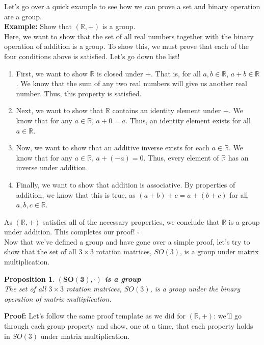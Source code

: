 \documentclass[oneside]{book}
\newtheorem{proposition}{Proposition}
\newenvironment{prop} %
  {\colorlet{shadecolor}{blue!9}\begin{shaded}\begin{proposition}}
  {\end{proposition}\end{shaded}}
\begin{document}
Let's go over a quick example to see how we can prove a set and binary operation are a group.\\
\textbf{Example:} Show that $(\mathbb{R}, +)$ is a group.\\
Here, we want to show that the set of all real numbers together with the binary operation of addition is a group. To show this, we must prove that each of the four conditions above is satisfied. Let's go down the list!
\begin{enumerate}
    \item First, we want to show $\mathbb{R}$ is closed under $+$. That is, for all $a, b \in \mathbb{R}$, $a + b \in \mathbb{R}$. We know that the sum of any two real numbers will give us another real number. Thus, this property is satisfied.
    \item Next, we want to show that $\mathbb{R}$ contains an identity element under $+$. We know that for any $a \in \mathbb{R}$, $a + 0 = a$. Thus, an identity element exists for all $a \in \mathbb{R}$.
    \item Now, we want to show that an additive inverse exists for each $a \in \mathbb{R}$. We know that for any $a \in \mathbb{R}$, $a + (-a) = 0$. Thus, every element of $\mathbb{R}$ has an inverse under addition.
    \item Finally, we want to show that addition is associative. By properties of addition, we know that this is true, as $(a+b)+c = a+(b+c)$ for all $a, b, c \in \mathbb{R}$.
\end{enumerate}
As $(\mathbb{R}, +)$ satisfies all of the necessary properties, we conclude that $\mathbb{R}$ is a group under addition. This completes our proof! $\square$\\
Now that we've defined a group and have gone over a simple proof, let's try to show that the set of all $3\times 3$ rotation matrices, $SO(3)$, is a group under matrix multiplication.
\begin{prop}
\textbf{$\mathbf{(SO(3), \cdot)}$ is a group}\\
The set of all $3\times 3$ rotation matrices, $SO(3)$, is a group under the binary operation of matrix multiplication.
\end{prop}\noindent
\textbf{Proof: }Let's follow the same proof template as we did for $(\mathbb{R}, +)$: we'll go through each group property and show, one at a time, that each property holds in $SO(3)$ under matrix multiplication.
\end{document}
